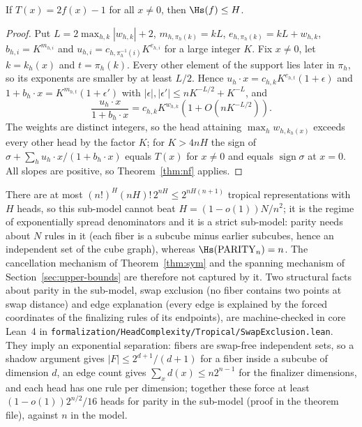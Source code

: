 \begin{theorem}
\label{thm:wn-tropical}
If $T(x)=2f(x)-1$ for all $x\ne0$, then $\Hs(f)\le H$.
\end{theorem}
\begin{proof}
Put $L=2\max_{h,k}|w_{h,k}|+2$, $m_{h,\pi_h(k)}=kL$,
$e_{h,\pi_h(k)}=kL+w_{h,k}$, $b_{h,i}=K^{m_{h,i}}$ and
$u_{h,i}=c_{h,\pi_h^{-1}(i)}K^{e_{h,i}}$ for a large integer $K$. Fix
$x\ne0$, let $k=k_h(x)$ and $t=\pi_h(k)$. Every other element of the
support lies later in $\pi_h$, so its exponents are smaller by at least
$L/2$. Hence $u_h\cdot x=c_{h,k}K^{e_{h,t}}(1+\epsilon)$ and
$1+b_h\cdot x=K^{m_{h,t}}(1+\epsilon')$ with $|\epsilon|,|\epsilon'|\le nK^{-L/2}+K^{-L}$, and
\[
 \frac{u_h\cdot x}{1+b_h\cdot x}=c_{h,k}K^{w_{h,k}}(1+O(nK^{-L/2})).
\]
The weights are distinct integers, so the head attaining
$\max_hw_{h,k_h(x)}$ exceeds every other head by the factor $K$; for
$K>4nH$ the sign of $\sigma+\sum_hu_h\cdot x/(1+b_h\cdot x)$ equals
$T(x)$ for $x\ne0$ and equals $\operatorname{sign}\sigma$ at $x=0$. All
slopes are positive, so Theorem~\ref{thm:nf} applies.
\end{proof}

There are at most $(n!)^H(nH)!\,2^{nH}\le2^{nH(n+1)}$ tropical
representations with $H$ heads, so this sub-model cannot beat
$H=(1-o(1))N/n^2$; it is the regime of exponentially spread denominators
and it is a strict sub-model: parity needs about $N$ rules in it (each
fiber is a subcube minus earlier subcubes, hence an independent set of
the cube graph), whereas $\Hs(\mathrm{PARITY}_n)=n$. The cancellation
mechanism of Theorem~\ref{thm:sym} and the spanning mechanism of
Section~\ref{sec:upper-bounds} are therefore not captured by it. Two
structural facts about parity in the sub-model, swap exclusion (no fiber
contains two points at swap distance) and edge explanation (every edge is
explained by the forced coordinates of the finalizing rules of its
endpoints), are machine-checked in core Lean~4 in
\texttt{formalization/HeadComplexity/Tropical/SwapExclusion.lean}. They
imply an exponential separation: fibers are swap-free independent sets,
so a shadow argument gives $|F|\le2^{d+1}/(d+1)$ for a fiber inside a
subcube of dimension $d$, an edge count gives $\sum_xd(x)\le n2^{n-1}$
for the finalizer dimensions, and each head has one rule per dimension;
together these force at least $(1-o(1))2^{n/2}/16$ heads for parity in
the sub-model (proof in the theorem file), against $n$ in the model.

